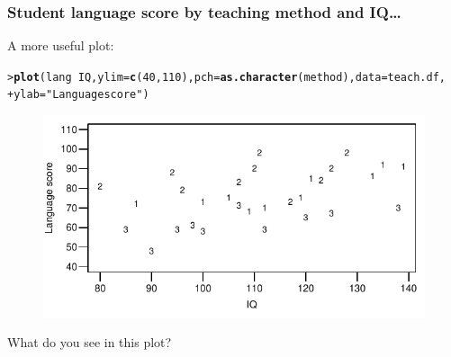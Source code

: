 \documentclass{beamer}\usepackage[]{graphicx}\usepackage[]{xcolor}
\makeatletter
\newcommand{\hlnum}[1]{\textcolor[rgb]{0.686,0.059,0.569}{#1}}%
\newcommand{\hlstr}[1]{\textcolor[rgb]{0.192,0.494,0.8}{#1}}%
\newcommand{\hlopt}[1]{\textcolor[rgb]{0,0,0}{#1}}%
\newcommand{\hlstd}[1]{\textcolor[rgb]{0.345,0.345,0.345}{#1}}%
\newcommand{\hlkwc}[1]{\textcolor[rgb]{0.333,0.667,0.333}{#1}}%
\newcommand{\hlkwd}[1]{\textcolor[rgb]{0.737,0.353,0.396}{\textbf{#1}}}%
\newenvironment{kframe}{%
 \def\at@end@of@kframe{}%
 \ifinner\ifhmode%
  \def\at@end@of@kframe{\end{minipage}}%
  \begin{minipage}{\columnwidth}%
 \fi\fi%
 \def\FrameCommand##1{\hskip\@totalleftmargin \hskip-\fboxsep
 \colorbox{shadecolor}{##1}\hskip-\fboxsep
     \hskip-\linewidth \hskip-\@totalleftmargin \hskip\columnwidth}%
 \MakeFramed {\advance\hsize-\width
   \@totalleftmargin\z@ \linewidth\hsize
   \@setminipage}}%
 {\par\unskip\endMakeFramed%
 \at@end@of@kframe}
\newenvironment{knitrout}{}{} %
\makeatother
\begin{document}
\begin{frame}[fragile]
\frametitle{Student language score by teaching method and IQ\ldots}
A more useful plot:
\begin{knitrout}\scriptsize
{}\color{fgcolor}\begin{kframe}
\begin{alltt}
\hlstd{> }\hlkwd{plot}\hlstd{(lang} \hlopt{~} \hlstd{IQ,} \hlkwc{ylim}\hlstd{=}\hlkwd{c}\hlstd{(}\hlnum{40}\hlstd{,}\hlnum{110}\hlstd{),} \hlkwc{pch}\hlstd{=}\hlkwd{as.character}\hlstd{(method),} \hlkwc{data} \hlstd{= teach.df,}
\hlstd{+ }     \hlkwc{ylab}\hlstd{=}\hlstr{"Language score"}\hlstd{)}
\end{alltt}
\end{kframe}
\end{knitrout}





\begin{figure}
  \centering
  \includegraphics{figure/RC-H09-007}
\end{figure}

What do you see in this plot?

\end{frame}
 
 
 
\end{document}
